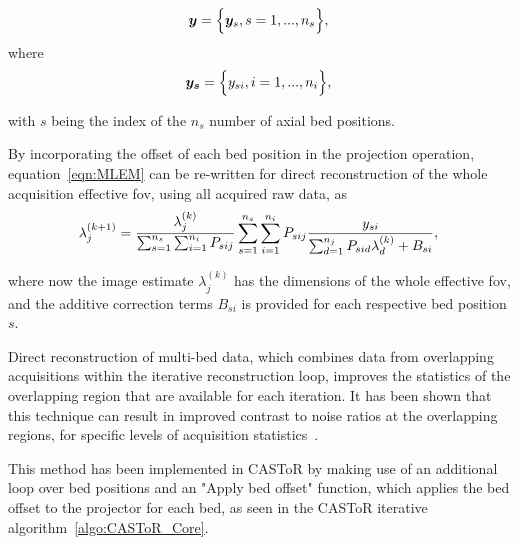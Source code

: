 \begin{equation}
   \bm{y} = \Big\{ {\bm{y}_s,s=1,...,n_s} \Big\} \\ , \\
\end{equation}
where
\begin{equation}
   \bm{y_s} = \Big\{ {y_{si},i=1,...,n_i} \Big\} \\ , \\
\end{equation}

with $s$ being the index of the $n_s$ number of axial bed positions.

By incorporating the offset of each bed position in the projection operation, equation~\ref{eqn:MLEM} can be re-written for direct reconstruction of the whole acquisition effective \gls{fov}, using all acquired raw data, as
\begin{equation}
\lambda_j^{(k+1)} = \frac{\lambda_j^{(k)}}{\sum_{s=1}^{n_s} \sum_{i=1}^{n_i} P_{sij}} 
\sum_{s=1}^{n_s} \sum_{i=1}^{n_i} P_{sij} 
\frac{y_{si}}{\sum_{d=1}^{n_j} P_{sid}\lambda_d^{(k)} + B_{si} } \\ , \\
\label{eqn:MLEM}
\end{equation} 

where now the image estimate $\lambda_j^{(k)}$ has the dimensions of the whole effective \gls{fov}, and the additive correction terms $B_{si}$ is provided for each respective bed position $s$. 

Direct reconstruction of multi-bed data, which combines data from overlapping acquisitions within the iterative reconstruction loop, improves the statistics of the overlapping region that are available for each iteration. It has been shown that this technique can result in improved contrast to noise ratios at the overlapping regions, for specific levels of acquisition statistics~\cite{Ross2004}. 

This method has been implemented in CASToR by making use of an additional loop over bed positions and an "Apply bed offset" function, which applies the bed offset to the projector for each bed, as seen in the CASToR iterative algorithm~\ref{algo:CASToR_Core}.
